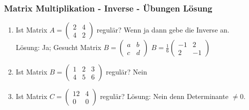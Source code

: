 \begin{frame}
\frametitle{Matrix Multiplikation - Inverse - Übungen Lösung}
\begin{enumerate}
\item Ist Matrix $A = \begin{pmatrix} 2 & 4 \\ 4 & 2 \end{pmatrix}$ regulär? Wenn ja dann gebe die Inverse an. \\
Lösung: Ja; Gesucht Matrix $B = \begin{pmatrix} a & b \\ c & d \end{pmatrix}$
$B = \frac{1}{6}\begin{pmatrix} -1 & 2 \\ 2 & -1 \end{pmatrix}$
\item Ist Matrix $B = \begin{pmatrix} 1 & 2 & 3 \\ 4 & 5 & 6 \end{pmatrix}$ regulär? Nein
\item  Ist Matrix $C = \begin{pmatrix} 12 & 4 \\ 0 & 0  \end{pmatrix}$ regulär?
Lösung: Nein denn Determinante $\neq 0$.
\end{enumerate}
\end{frame}



















